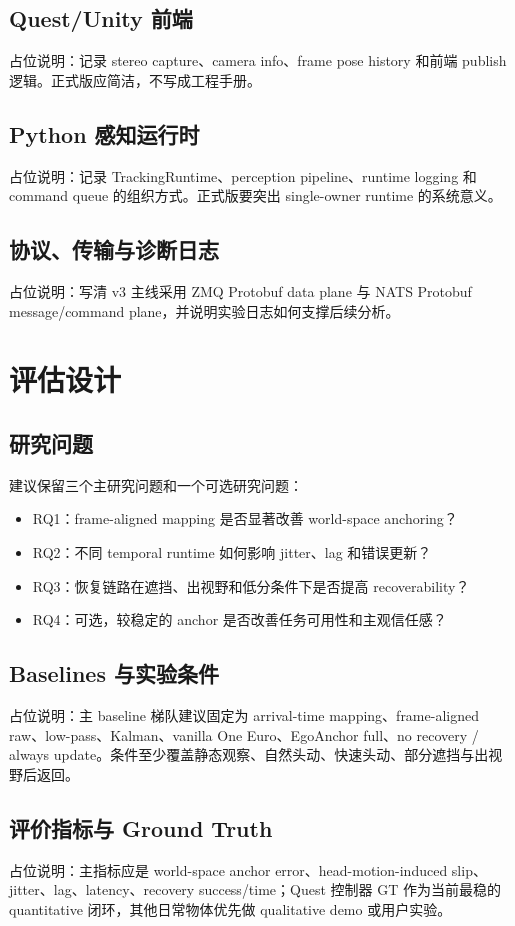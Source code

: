 \documentclass[review]{vgtc}
\begin{document}
\subsection{Quest/Unity 前端}
占位说明：记录 stereo capture、camera info、frame pose history 和前端 publish 逻辑。正式版应简洁，不写成工程手册。

\subsection{Python 感知运行时}
占位说明：记录 TrackingRuntime、perception pipeline、runtime logging 和 command queue 的组织方式。正式版要突出 single-owner runtime 的系统意义。

\subsection{协议、传输与诊断日志}
占位说明：写清 v3 主线采用 ZMQ Protobuf data plane 与 NATS Protobuf message/command plane，并说明实验日志如何支撑后续分析。

\section{评估设计}

\subsection{研究问题}
建议保留三个主研究问题和一个可选研究问题：
\begin{itemize}
  \item RQ1：frame-aligned mapping 是否显著改善 world-space anchoring？
  \item RQ2：不同 temporal runtime 如何影响 jitter、lag 和错误更新？
  \item RQ3：恢复链路在遮挡、出视野和低分条件下是否提高 recoverability？
  \item RQ4：可选，较稳定的 anchor 是否改善任务可用性和主观信任感？
\end{itemize}

\subsection{Baselines 与实验条件}
占位说明：主 baseline 梯队建议固定为 arrival-time mapping、frame-aligned raw、low-pass、Kalman、vanilla One Euro、EgoAnchor full、no recovery / always update。条件至少覆盖静态观察、自然头动、快速头动、部分遮挡与出视野后返回。

\subsection{评价指标与 Ground Truth}
占位说明：主指标应是 world-space anchor error、head-motion-induced slip、jitter、lag、latency、recovery success/time；Quest 控制器 GT 作为当前最稳的 quantitative 闭环，其他日常物体优先做 qualitative demo 或用户实验。
\end{document}
